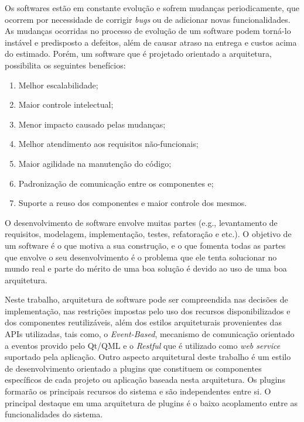 Os softwares estão em constante evolução e sofrem mudanças periodicamente, que ocorrem por necessidade de corrigir \textit{bugs} ou de adicionar novas funcionalidades. As mudanças ocorridas no processo de evolução de um software podem torná-lo instável e predisposto a defeitos, além de causar atraso na entrega e custos acima do estimado. Porém, um software que é projetado orientado a arquitetura, possibilita os seguintes benefícios:
\begin{enumerate}
		\item Melhor escalabilidade;
		\item Maior controle intelectual;
		\item Menor impacto causado pelas mudanças;
		\item Melhor atendimento aos requisitos não-funcionais;
		\item Maior agilidade na manutenção do código;
		\item Padronização de comunicação entre os componentes e;
		\item Suporte a reuso dos componentes e maior controle dos mesmos.
\end{enumerate}

O desenvolvimento de software envolve muitas partes (e.g., levantamento de requisitos, modelagem, implementação, testes, refatoração e etc.). O objetivo de um software é o que motiva a sua construção, e o que fomenta todas as partes que envolve o seu desenvolvimento é o problema que ele tenta solucionar no mundo real e parte do mérito de uma boa solução é devido ao uso de uma boa arquitetura.

Neste trabalho, arquitetura de software pode ser compreendida nas decisões de implementação, nas restrições impostas pelo uso dos recursos disponibilizados e dos componentes reutilizáveis, além dos estilos arquiteturais provenientes das APIs utilizadas, tais como, o \textit{Event-Based}, mecanismo de comunicação orientado a eventos provido pelo Qt/QML e o \textit{Restful} que é utilizado como \textit{web service} suportado pela aplicação. Outro aspecto arquitetural deste trabalho é um estilo de desenvolvimento orientado a plugins que constituem os componentes específicos de cada projeto ou aplicação baseada nesta arquitetura. Os plugins formarão os principais recursos do sistema e são independentes entre si. O principal destaque em uma arquitetura de plugins é o baixo acoplamento entre as funcionalidades do sistema.


